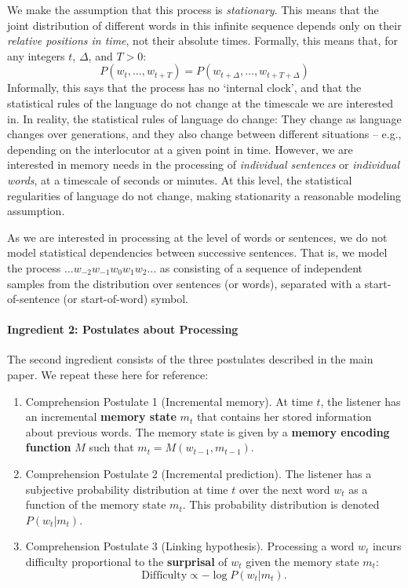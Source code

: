 \documentclass[11pt,letterpaper]{article}
\newcommand{\key}[1]{\textbf{#1}}
\begin{document}
We make the assumption that this process is \emph{stationary}.
This means that the joint distribution of different words in this infinite sequence depends only on their \emph{relative positions in time}, not their absolute times.
Formally, this means that, for any integers $t$, $\Delta$, and $T>0$:
\begin{equation}
	P(w_t, \dots, w_{t+T}) = 	P(w_{t+\Delta}, \dots, w_{t+T+\Delta})
\end{equation}
Informally, this says that the process has no `internal clock', and that the statistical rules of the language do not change at the timescale we are interested in.
In reality, the statistical rules of language do change: They change as language changes over generations, and they also change between different situations -- e.g., depending on the interlocutor at a given point in time.
However, we are interested in memory needs in the processing of \emph{individual sentences} or \emph{individual words}, at a timescale of seconds or minutes.
At this level, the statistical regularities of language do not change, making stationarity a reasonable modeling assumption.

As we are interested in processing at the level of words or sentences, we do not model statistical dependencies between successive sentences.
That is, we model the process $\dots w_{-2} w_{-1} w_0 w_{1} w_{2} \dots$ as consisting of a sequence of independent samples from the distribution over sentences (or words), separated with a start-of-sentence (or start-of-word) symbol.

\paragraph{Ingredient 2: Postulates about Processing}
The second ingredient consists of the three postulates described in the main paper.
We repeat these here for reference:
\begin{enumerate}
    \item Comprehension Postulate 1 (Incremental memory). At time $t$, the listener has an incremental \key{memory state} $m_t$ that contains her stored information about previous words. The memory state is given by a \key{memory encoding function} $M$ such that $m_t = M(w_{t-1}, m_{t-1})$.
    \item Comprehension Postulate 2 (Incremental prediction). The listener has a subjective probability distribution at time $t$ over the next word $w_t$ as a function of the memory state $m_t$. This probability distribution is denoted $P(w_t|m_t)$.
    \item Comprehension Postulate 3 (Linking hypothesis). Processing a word $w_t$ incurs difficulty proportional to the \key{surprisal} of $w_t$ given the memory state $m_t$:
    \begin{equation}
    \label{eq:lossy-surp}
    \text{Difficulty} \propto -\log P(w_t | m_t).
\end{equation}
\end{enumerate}
\end{document}
